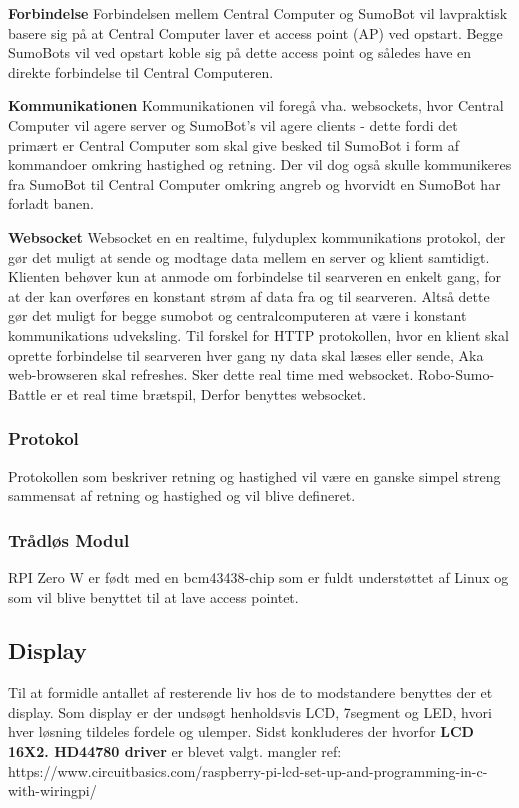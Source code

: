 \textbf{Forbindelse}\newline
Forbindelsen mellem Central Computer og SumoBot vil lavpraktisk basere sig på at Central Computer laver et access point (AP) ved opstart. Begge SumoBots vil ved opstart koble sig på dette access point og således have en direkte forbindelse til Central Computeren. 

\textbf{Kommunikationen}\newline
Kommunikationen vil foregå vha. websockets, hvor Central Computer vil agere server og SumoBot's vil agere clients - dette fordi det primært er Central Computer som skal give besked til SumoBot i form af kommandoer omkring hastighed og retning. Der vil dog også skulle kommunikeres fra SumoBot til Central Computer omkring angreb og hvorvidt en SumoBot har forladt banen. 

\textbf{Websocket}\newline
Websocket en en realtime, fulyduplex kommunikations protokol, der gør det muligt at sende og modtage data mellem en server og klient samtidigt. Klienten behøver kun at anmode om forbindelse til searveren en enkelt gang, for at der kan overføres en konstant strøm af data fra og til searveren. Altså dette gør det muligt for begge sumobot og centralcomputeren at være i konstant kommunikations udveksling. Til forskel for HTTP protokollen, hvor en klient skal oprette forbindelse til searveren hver gang ny data skal læses eller sende, Aka web-browseren skal refreshes. Sker dette real time med websocket. Robo-Sumo-Battle er et real time brætspil, Derfor benyttes websocket.

\subsubsection{Protokol}
Protokollen som beskriver retning og hastighed vil være en ganske simpel streng sammensat af retning og hastighed og vil blive defineret. 

\subsubsection{Trådløs Modul}
RPI Zero W er født med en bcm43438-chip som er fuldt understøttet af Linux og som vil blive benyttet til at lave access pointet. 

\subsection{Display}
Til at formidle antallet af resterende liv hos de to modstandere benyttes der et display. Som display er der undsøgt henholdsvis LCD, 7segment og LED, hvori hver løsning tildeles fordele og ulemper. Sidst konkluderes der hvorfor \textbf{LCD 16X2. HD44780 driver} er blevet valgt.
\newline
mangler ref:\\
https://www.circuitbasics.com/raspberry-pi-lcd-set-up-and-programming-in-c-with-wiringpi/\\


